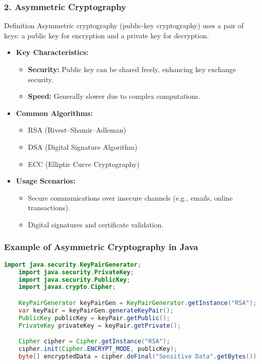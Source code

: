 \documentclass{beamer}
\begin{document}
\begin{frame}[fragile]
    \frametitle{2. Asymmetric Cryptography}
    \begin{block}{Definition}
        Asymmetric cryptography (public-key cryptography) uses a pair of keys: a public key for encryption and a private key for decryption.
    \end{block}
    \begin{itemize}
        \item \textbf{Key Characteristics:}
            \begin{itemize}
                \item \textbf{Security:} Public key can be shared freely, enhancing key exchange security.
                \item \textbf{Speed:} Generally slower due to complex computations.
            \end{itemize}
        \item \textbf{Common Algorithms:}
            \begin{itemize}
                \item RSA (Rivest–Shamir–Adleman)
                \item DSA (Digital Signature Algorithm)
                \item ECC (Elliptic Curve Cryptography)
            \end{itemize}
        \item \textbf{Usage Scenarios:}
            \begin{itemize}
                \item Secure communications over insecure channels (e.g., emails, online transactions).
                \item Digital signatures and certificate validation.
            \end{itemize}
    \end{itemize}
\end{frame}

\begin{frame}[fragile]
    \frametitle{Example of Asymmetric Cryptography in Java}
    \begin{lstlisting}[language=Java]
    import java.security.KeyPairGenerator;
    import java.security.PrivateKey;
    import java.security.PublicKey;
    import javax.crypto.Cipher;

    KeyPairGenerator keyPairGen = KeyPairGenerator.getInstance("RSA");
    var keyPair = keyPairGen.generateKeyPair();
    PublicKey publicKey = keyPair.getPublic();
    PrivateKey privateKey = keyPair.getPrivate();

    Cipher cipher = Cipher.getInstance("RSA");
    cipher.init(Cipher.ENCRYPT_MODE, publicKey);
    byte[] encryptedData = cipher.doFinal("Sensitive Data".getBytes());
    \end{lstlisting}
\end{frame}
\end{document}

